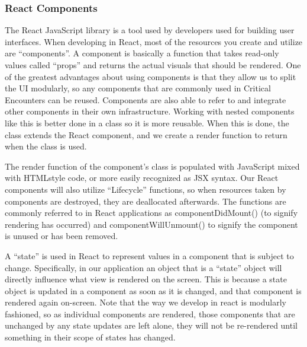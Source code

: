 \documentclass[letterpaper, 10 pt, conference]{ieeeconf}
\begin{document}
\subsubsection{React Components}
The React JavaScript library is a tool used by developers used for building user
interfaces. When developing in React, most of the resources you create and utilize
are ``components''. A component is basically a function that takes read-only values
called ``props'' and returns the actual visuals that should be rendered. One of the
greatest advantages about using components is that they allow us to split the
UI modularly, so any components that are commonly used in Critical Encounters
can be reused. Components are
also able to refer to and integrate other components in their own infrastructure.
Working with nested components like this is better done in a class so it is more
reusable. When this is done, the class extends the React component, and we create
a render function to return when the class is used. \par
The render function of the component’s class is populated with JavaScript
mixed with HTMLstyle code, or more easily recognized as JSX syntax. Our React
components will also utilize ``Lifecycle'' functions, so when resources taken
by components are destroyed, they are deallocated afterwards. The functions
are commonly referred to in React applications as componentDidMount() (to
signify rendering has occurred) and componentWillUnmount() to signify the
component is unused or has been removed. \par
A ``state'' is used in React to represent values in a component that is subject
to change. Specifically, in our application an object that is a “state” object will
directly influence what view is rendered on the screen. This is because a state
object is updated in a component as soon as it is changed, and that component
is rendered again on-screen. Note that the way we develop in react is modularly
fashioned, so as individual components are rendered, those components that are
unchanged by any state updates are left alone, they will not be re-rendered until
something in their scope of states has changed. \cite{c5}
\end{document}
